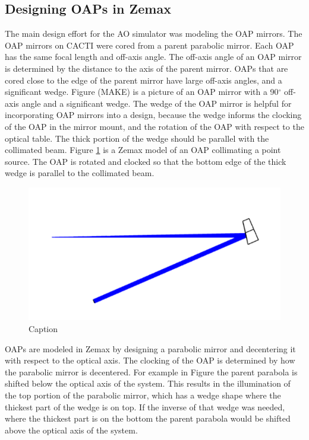 \subsection{Designing OAPs in Zemax}
The main design effort for the AO simulator was modeling the OAP mirrors. The OAP mirrors on CACTI were cored from a parent parabolic mirror. Each OAP has the same focal length and off-axis angle. The off-axis angle of an OAP mirror is determined by the distance to the axis of the parent mirror. OAPs that are cored close to the edge of the parent mirror have large off-axis angles, and a significant wedge. Figure (MAKE) is a picture of an OAP mirror with a 90$^{\circ}$ off-axis angle and a significant wedge. The wedge of the OAP mirror is helpful for incorporating OAP mirrors into a design, because the wedge informs the clocking of the OAP in the mirror mount, and the rotation of the OAP with respect to the optical table. The thick portion of the wedge should be parallel with the collimated beam. Figure \ref{fig:OAPcol} is a Zemax model of an OAP collimating a point source. The OAP is rotated and clocked so that the bottom edge of the thick wedge is parallel to the collimated beam. 


\begin{figure}
    \centering
    \includegraphics{Chapter Materials/Chapter Five Materials/OAPcollimate.png}
    \caption{Caption}
    \label{fig:OAPcol}
\end{figure}

OAPs are modeled in Zemax by designing a parabolic mirror and decentering it with respect to the optical axis. The clocking of the OAP is determined by how the parabolic mirror is decentered. For example in Figure  the parent parabola is shifted below the optical axis of the system. This results in the illumination of the top portion of the parabolic mirror, which has a wedge shape where the thickest part of the wedge is on top. If the inverse of that wedge was needed, where the thickest part is on the bottom the parent parabola would be shifted above the optical axis of the system. 

